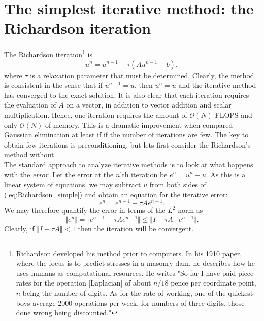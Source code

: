\section{The simplest iterative method: the Richardson iteration}
The Richardson iteration\footnote{
Richardson developed his method prior to computers. 
In his 1910 paper, where the focus is to predict stresses in a masonry dam, he 
describes how he uses humans as computational resources.  
He writes "So far I have paid piece rates for
the operation [Laplacian] of about $n/18$ pence per coordinate point, $n$
being the number of digits. As for the rate of working, one of the quickest 
boys average 2000 operations per week, for numbers of three digits, those
done wrong being discounted."}    is  
\begin{equation}
\label{eq:Richardson_simple}
u^n = u^{n-1} - \tau (A u^{n-1} - b),
\end{equation}
where $\tau$ is a relaxation parameter that must be determined.
Clearly, the method is consistent in the sense that  
if $u^{n-1} = u$, then $u^{n} = u$ and the iterative method has converged to 
the exact solution. It is also clear that each iteration requires the evaluation of $A$ on a vector, in 
addition to vector addition and scalar multiplication. Hence, one iteration requires
the amount of  $\mathcal{O}(N)$ FLOPS and only $\mathcal{O}(N)$ 
of memory. This is a dramatic improvement when compared Gaussian elimination at least if  
if the number of iterations are few. The key to obtain few iterations is 
preconditioning, but lets first consider the Richardson's method without.     
\\

The standard approach to analyze iterative methods is to look at what happens with the \textit{error}.
Let the error at the $n$'th iteration be  
$e^n = u^n -u$. As this is a linear system of equations, we may subtract $u$ from both sides of (\ref{eq:Richardson_simple}) 
and obtain an equation for the iterative error: 
\[
e^n = e^{n-1} - \tau A e^{n-1} .
\]
We may therefore quantify the error in terms of the $L^2$-norm as
\[
\Vert e^n \Vert = \Vert e^{n-1} - \tau A e^{n-1} \Vert \leqslant \Vert I - \tau A \Vert \Vert e^{n-1}\Vert .  
\]
Clearly, if $\Vert I - \tau A \Vert < 1$ then the iteration will be convergent. 
\\

